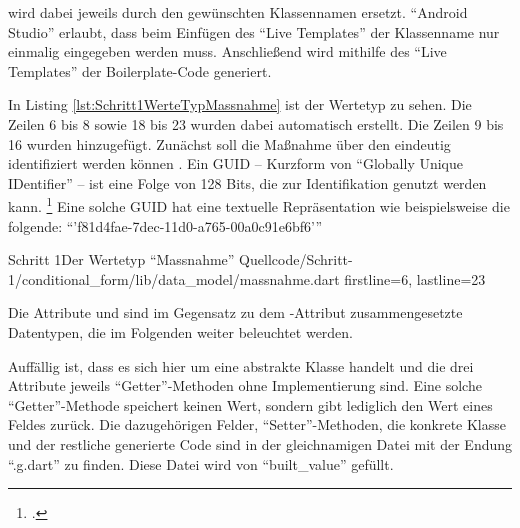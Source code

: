  wird dabei jeweils durch den gewünschten Klassennamen ersetzt.
\enquote{Android Studio} erlaubt, dass beim Einfügen des \enquote{Live Templates} der Klassenname nur einmalig eingegeben werden muss.
Anschließend wird mithilfe des \enquote{Live Templates} der Boilerplate-Code generiert.

In Listing \ref{lst:Schritt1WerteTypMassnahme} ist der Wertetyp  zu sehen.
Die Zeilen 6 bis 8 sowie 18 bis 23 wurden dabei automatisch erstellt.
Die Zeilen 9 bis 16 wurden hinzugefügt.
Zunächst soll die Maßnahme über den  eindeutig identifiziert werden können .
Ein GUID -- Kurzform von \enquote{Globally Unique IDentifier} -- ist  eine Folge von 128 Bits, die zur Identifikation genutzt werden kann. \footcite[Vgl.][S. 1]{rfc4122}
Eine solche GUID hat eine textuelle Repräsentation wie beispielsweise die folgende: \enquote{'f81d4fae-7dec-11d0-a765-00a0c91e6bf6'}

\begin{alexlisting}{Schritt 1}{Der Wertetyp \enquote{Massnahme}}
  {Quellcode/Schritt-1/conditional_form/lib/data_model/massnahme.dart}
  {firstline=6, lastline=23}
  \label{lst:Schritt1WerteTypMassnahme}
\end{alexlisting}

Die Attribute   und   sind im Gegensatz zu dem -Attribut  zusammengesetzte Datentypen,
die im Folgenden weiter beleuchtet werden.

Auffällig ist, dass es sich hier um eine abstrakte Klasse handelt und die drei Attribute jeweils \enquote{Getter}-Methoden ohne Implementierung sind.
Eine solche \enquote{Getter}-Methode speichert keinen Wert, sondern gibt lediglich den Wert eines Feldes zurück.
Die dazugehörigen Felder, \enquote{Setter}-Methoden,
die konkrete Klasse und der restliche generierte Code sind in der gleichnamigen Datei mit der Endung \enquote{.g.dart}  zu finden.
Diese Datei wird von \enquote{built_value} gefüllt.

